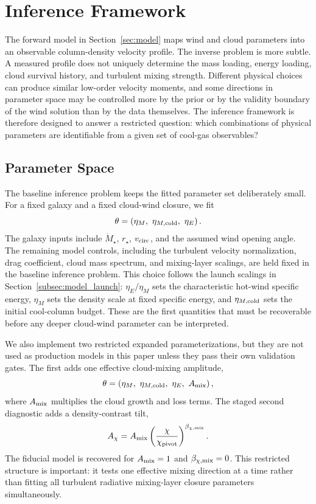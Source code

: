 \section{Inference Framework}
\label{sec:inference_framework}

The forward model in Section~\ref{sec:model} maps wind and cloud parameters
into an observable column-density velocity profile.  The inverse problem is more
subtle.  A measured profile does not uniquely determine the mass loading, energy
loading, cloud survival history, and turbulent mixing strength.  Different
physical choices can produce similar low-order velocity moments, and some
directions in parameter space may be controlled more by the prior or by the
validity boundary of the wind solution than by the data themselves.  The
inference framework is therefore designed to answer a restricted question:
which combinations of physical parameters are identifiable from a given set of
cool-gas observables?

\subsection{Parameter Space}
\label{subsec:inference_parameters}

The baseline inference problem keeps the fitted parameter set deliberately
small.  For a fixed galaxy and a fixed cloud-wind closure, we fit
\begin{equation}
\theta
=
\left(\eta_M,\ \eta_{M,\rm cold},\ \eta_E\right).
\label{eq:baseline_theta}
\end{equation}
The galaxy inputs include $\dot M_\star$, $r_\star$, $v_{\rm circ}$, and the
assumed wind opening angle.  The remaining model controls, including the
turbulent velocity normalization, drag coefficient, cloud mass spectrum, and
mixing-layer scalings, are held fixed in the baseline inference problem.  This
choice follows the launch scalings in Section~\ref{subsec:model_launch}:
$\eta_E/\eta_M$ sets the characteristic hot-wind specific energy, $\eta_M$
sets the density scale at fixed specific energy, and
$\eta_{M,\rm cold}$ sets the initial cool-column budget.  These are the first
quantities that must be recoverable before any deeper cloud-wind parameter can
be interpreted.

We also implement two restricted expanded parameterizations, but they are not
used as production models in this paper unless they pass their own validation
gates.  The first adds one effective cloud-mixing amplitude,
\begin{equation}
\theta
=
\left(\eta_M,\ \eta_{M,\rm cold},\ \eta_E,\ A_{\rm mix}\right),
\end{equation}
where $A_{\rm mix}$ multiplies the cloud growth and loss terms.  The staged
second diagnostic adds a density-contrast tilt,
\begin{equation}
A_\chi = A_{\rm mix}
\left({\chi\over \chi_{\rm pivot}}\right)^{\beta_{\chi,\rm mix}}.
\end{equation}
The fiducial model is recovered for $A_{\rm mix}=1$ and
$\beta_{\chi,\rm mix}=0$.  This restricted structure is important: it tests one
effective mixing direction at a time rather than fitting all turbulent
radiative mixing-layer closure parameters simultaneously.

